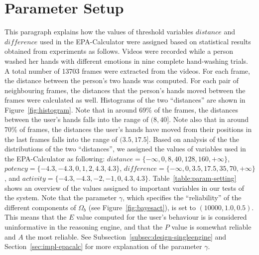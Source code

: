 \section{Parameter Setup}
This paragraph explains how the values of threshold variables $distance$ and $difference$ used in the EPA-Calculator were assigned based on statistical results obtained from experiments as follows. Videos were recorded while a person washed her hands with different emotions in nine complete hand-washing trials. A total number of 13703 frames were extracted from the videos. For each frame, the distance between the person's two hands was computed. For each pair of neighbouring frames, the distances that the person's hands moved between the frames were calculated as well. Histograms of the two ``distances'' are shown in Figure~\ref{fig:histogram}. Note that in around 69\% of the frames, the distances between the user's hands falls into the range of $(8, 40]$. Note also that in around 70\% of frames, the distances the user's hands have moved from their positions in the last frames falls into the range of $(3.5, 17.5]$. Based on analysis of the the distributions of the two ``distances'', we assigned the values of variables used in the EPA-Calculator as following: $distance = \{-\infty, 0, 8, 40, 128, 160, +\infty\}$, $potency = \{-4.3, -4.3, 0, 1, 2, 4.3, 4.3\}$, $difference = \{-\infty, 0, 3.5, 17.5, 35, 70, +\infty\}$, and $activity = \{-4.3, -4.3, -2, -1, 0, 4.3, 4.3\}$. Table~\ref{table:param-setting} shows an overview of the values assigned to important variables in our tests of the system. Note that the parameter $\gamma$, which specifies the ``reliability'' of the different components of $\Omega_b$ (see Figure~\ref{fig:bayesact}), is set to $(10000,1.0,0.5)$. This means that the $E$ value computed for the user's behaviour is is considered uninformative in the reasoning engine, and that the $P$ value is somewhat reliable and $A$ the most reliable. See Subsection~\ref{subsec:design-singleengine} and Section~\ref{sec:impl-epacalc} for more explanation of the parameter $\gamma$.

